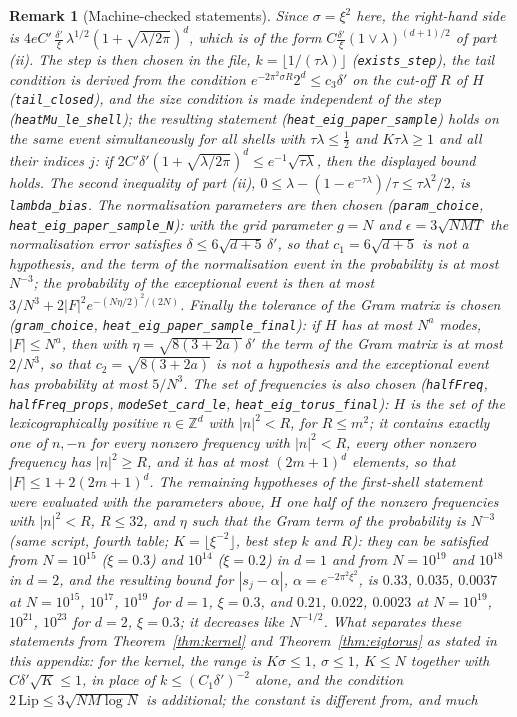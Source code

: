 \documentclass[11pt,a4paper]{article}
\theoremstyle{stmt}
\theoremstyle{defn}
\theoremstyle{rmk}
\newtheorem{remark}[theorem]{Remark}
\numberwithin{equation}{section}
\begin{document}
{\begin{remark}[Machine-checked statements]
Since $\sigma=\xi^2$ here, the right-hand side is $4eC'\,\frac{\delta'}{\xi}\,\lambda^{1/2}(1+\sqrt{\lambda/2\pi})^d$, which is of the form $C\frac{\delta'}\xi(1\vee\lambda)^{(d+1)/2}$ of part (ii). The step is then chosen in the file, $k=\lfloor1/(\tau\lambda)\rfloor$ (\texttt{exists\_step}), the tail condition is derived from the condition $e^{-2\pi^2\sigma R}2^d\le c_3\delta'$ on the cut-off $R$ of $H$ (\texttt{tail\_closed}), and the size condition is made independent of the step (\texttt{heatMu\_le\_shell}); the resulting statement (\texttt{heat\_eig\_paper\_sample}) holds on the same event simultaneously for all shells with $\tau\lambda\le\frac12$ and $K\tau\lambda\ge1$ and all their indices $j$: if $2C'\delta'(1+\sqrt{\lambda/2\pi})^d\le e^{-1}\sqrt{\tau\lambda}$, then the displayed bound holds. The second inequality of part (ii), $0\le\lambda-(1-e^{-\tau\lambda})/\tau\le\tau\lambda^2/2$, is \texttt{lambda\_bias}. The normalisation parameters are then chosen (\texttt{param\_choice}, \texttt{heat\_eig\_paper\_sample\_N}): with the grid parameter $g=N$ and $\epsilon=3\sqrt{NMT}$ the normalisation error satisfies $\delta\le6\sqrt{d+5}\,\delta'$, so that $c_1=6\sqrt{d+5}$ is not a hypothesis, and the term of the normalisation event in the probability is at most $N^{-3}$; the probability of the exceptional event is then at most $3/N^3+2|F|^2e^{-(N\eta/2)^2/(2N)}$. Finally the tolerance of the Gram matrix is chosen (\texttt{gram\_choice}, \texttt{heat\_eig\_paper\_sample\_final}): if $H$ has at most $N^a$ modes, $|F|\le N^a$, then with $\eta=\sqrt{8(3+2a)}\,\delta'$ the term of the Gram matrix is at most $2/N^3$, so that $c_2=\sqrt{8(3+2a)}$ is not a hypothesis and the exceptional event has probability at most $5/N^3$. The set of frequencies is also chosen (\texttt{halfFreq}, \texttt{halfFreq\_props}, \texttt{modeSet\_card\_le}, \texttt{heat\_eig\_torus\_final}): $H$ is the set of the lexicographically positive $n\in\mathbb Z^d$ with $|n|^2<R$, for $R\le m^2$; it contains exactly one of $n,-n$ for every nonzero frequency with $|n|^2<R$, every other nonzero frequency has $|n|^2\ge R$, and it has at most $(2m+1)^d$ elements, so that $|F|\le1+2(2m+1)^d$. The remaining hypotheses of the first-shell statement were evaluated with the parameters above, $H$ one half of the nonzero frequencies with $|n|^2<R$, $R\le32$, and $\eta$ such that the Gram term of the probability is $N^{-3}$ (same script, fourth table; $K=\lfloor\xi^{-2}\rfloor$, best step $k$ and $R$): they can be satisfied from $N=10^{15}$ ($\xi=0.3$) and $10^{14}$ ($\xi=0.2$) in $d=1$ and from $N=10^{19}$ and $10^{18}$ in $d=2$, and the resulting bound for $|s_j-\alpha|$, $\alpha=e^{-2\pi^2\xi^2}$, is $0.33$, $0.035$, $0.0037$ at $N=10^{15}$, $10^{17}$, $10^{19}$ for $d=1$, $\xi=0.3$, and $0.21$, $0.022$, $0.0023$ at $N=10^{19}$, $10^{21}$, $10^{23}$ for $d=2$, $\xi=0.3$; it decreases like $N^{-1/2}$. What separates these statements from Theorem~\ref{thm:kernel} and Theorem~\ref{thm:eigtorus} as stated in this appendix: for the kernel, the range is $K\sigma\le1$, $\sigma\le1$, $K\le N$ together with $C\delta'\sqrt K\le1$, in place of $k\le(C_1\delta')^{-2}$ alone, and the condition $2\,\mathrm{Lip}\le3\sqrt{NM\log N}$ is additional; the constant is different from, and much 
\end{remark}}
\end{document}
